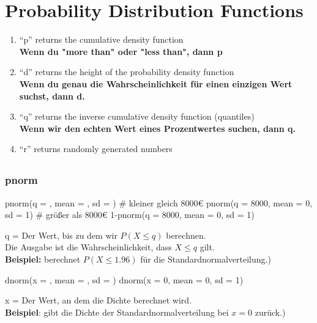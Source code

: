 \section{Probability Distribution Functions}

\begin{enumerate}
    \item “p” returns the cumulative density function\\\textbf{Wenn du "more than" oder "less than", dann p}
    \item “d” returns the height of the probability density function\\ \textbf{Wenn du genau die Wahrscheinlichkeit für einen einzigen Wert suchst, dann d.}
    \item “q” returns the inverse cumulative density function (quantiles)\\ \textbf{Wenn wir den echten Wert eines Prozentwertes suchen, dann q.}
    \item “r” returns randomly generated numbers
\end{enumerate}
\subsection{}
\subsubsection{pnorm}
\begin{rcode}{1}
pnorm(q = , mean = , sd = )
# kleiner gleich 8000€
pnorm(q = 8000, mean = 0, sd = 1)
# größer als 8000€
1-pnorm(q = 8000, mean = 0, sd = 1)
\end{rcode}
q = Der Wert, bis zu dem wir \(P(X \le q)\) berechnen.\\
Die Ausgabe ist die Wahrscheinlichkeit, dass \(X \le q\) gilt.\\
\textbf{Beispiel:} berechnet \(P(X \le 1.96)\) für die Standardnormalverteilung.)\\
\begin{rcode}{1}
dnorm(x = , mean = , sd = )
dnorm(x = 0, mean = 0, sd = 1)
\end{rcode}
x = Der Wert, an dem die Dichte berechnet wird.\\
\textbf{Beispiel}: gibt die Dichte der Standardnormalverteilung bei \(x = 0\) zurück.)

\bigskip

